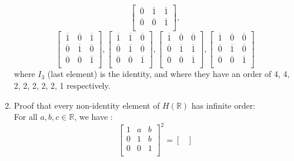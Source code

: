 \documentclass{article}
\newcommand{\R}{\mathbb{R}}
\newcommand{\olsi}[1]{\,\overline{\!{#1}}}
\begin{document}
\begin{enumerate}[label=\textbf{\alph*.}]
\[\begin{bmatrix}
                \olsi{0} & \olsi{1} & \olsi{1} \\
                \olsi{0} & \olsi{0} & \olsi{1} \\
            \end{bmatrix}, \]
            \[ \begin{bmatrix}
                \olsi{1} & \olsi{0} & \olsi{1} \\
                \olsi{0} & \olsi{1} & \olsi{0} \\
                \olsi{0} & \olsi{0} & \olsi{1} \\
            \end{bmatrix},
            \begin{bmatrix}
                \olsi{1} & \olsi{1} & \olsi{0} \\
                \olsi{0} & \olsi{1} & \olsi{0} \\
                \olsi{0} & \olsi{0} & \olsi{1} \\
            \end{bmatrix},
            \begin{bmatrix}
                \olsi{1} & \olsi{0} & \olsi{0} \\
                \olsi{0} & \olsi{1} & \olsi{1} \\
                \olsi{0} & \olsi{0} & \olsi{1} \\
            \end{bmatrix},
            \begin{bmatrix}
                \olsi{1} & \olsi{0} & \olsi{0} \\
                \olsi{0} & \olsi{1} & \olsi{0} \\
                \olsi{0} & \olsi{0} & \olsi{1} \\
            \end{bmatrix} \]
            where $I_3$ (last element) is the identity, and where they
            have an order of 4, 4, 2, 2, 2, 2, 2, 1 respectively.
        \item
            Proof that every non-identity element of $H(\R)$ has infinite
            order: \\
            For all $a, b, c \in \R$, we have :
            \[ \begin{bmatrix}
                1 & a & b \\
                0 & 1 & b \\
                0 & 0 & 1 \\
            \end{bmatrix}^2
            = \begin{bmatrix}

\end{bmatrix}\]
\end{enumerate}
\end{document}

